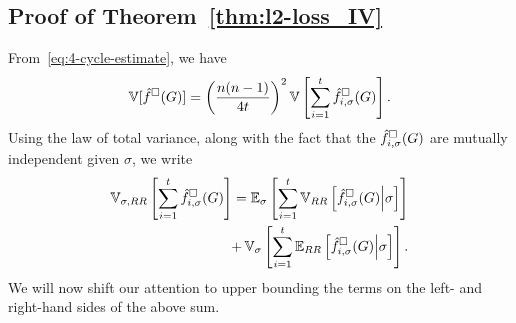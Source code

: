 \subsection{Proof of Theorem~\ref{thm:l2-loss_IV}}
\label{sub:l2-loss_IV_proof}
From~\eqref{eq:4-cycle-estimate}, we have
\begin{align*}
  \operatorname{\mathbb{V}}[\hat{f}^\square(G)] = \left(\frac{n(n-1)}{4t}\right)^2 \operatorname{\mathbb{V}}\left[\sum_{i=1}^t
  \hat{f}_{i,\sigma}^\square(G)\right].
\end{align*}
Using the law of total variance, along with the fact that the
$\hat{f}_{i,\sigma}^\square(G)$ are mutually independent given $\sigma$, we write
\begin{align}
  \operatorname{\mathbb{V}}_{\sigma, RR}\left[\sum_{i=1}^t \hat{f}_{i,\sigma}^\square(G)\right] = \operatorname{\mathbb{E}}_\sigma\left[\sum_{i=1}^t
    \operatorname{\mathbb{V}}_{RR}\left[\hat{f}_{i,\sigma}^\square(G) \middle| \sigma\right]\right] \label{eq:4-cycle-ev}\\
    + \operatorname{\mathbb{V}}_\sigma\left[ \sum_{i=1}^t
    \operatorname{\mathbb{E}}_{RR}\left[\hat{f}_{i,\sigma}^\square(G)\middle| \sigma
    \right]\right]. \label{eq:4-cycle-ve}
\end{align}
We will now shift our attention to upper bounding the terms on the left- and right-hand sides of the above sum.

